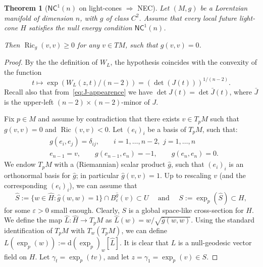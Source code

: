 \documentclass[12pt,a4paper]{amsart}
\theoremstyle{plain}
\newtheorem{theorem}[lemma]{Theorem}
\theoremstyle{definition}
\numberwithin{equation}{section}
\let\temp\phi
\let\phi\varphi
\let\temp\epsilon
\let\epsilon\varepsilon
\let\varepsilon\temp
\DeclareMathOperator{\Ric}{Ric}
\newcommand{\de}{{\mathrm{d}}}
\newcommand{\NC}{\mathsf{NC}}
\begin{document}
\begin{theorem}[$\NC^1(n)$ on light-cones $\Rightarrow$ NEC]\label{thm:NC1toNEC}
  Let $(M,g)$ be a Lorentzian manifold of dimension $n$, with $g$ of
  class $C^2$.
  Assume that every local future light-cone $H$ satisfies the
   null energy condition $\NC^1(n)$.

  Then $\Ric_g(v,v)\geq 0$ for any $v\in TM$, such that $g(v,v)=0$.
\end{theorem}


\begin{proof}
By the the definition of $W_{L}$, the hypothesis coincides with the convexity of the function
\begin{equation*}
  t\mapsto \exp(W_{L}(z,t)/(n-2))=(\det(J(t)))^{1/(n-2)}
  .
\end{equation*}
Recall also that from~\eqref{eq:J-appearence} we have
  $\det J(t)=\det \bar J(t)$, where $\bar J$ is the upper-left
  $(n-2)\times(n-2)$-minor of $J$.

  Fix $p\in M$ and assume by contradiction that there exists  $v\in T_pM$ such that  $g(v,v)=0$ and $\Ric(v,v)<0$.
  Let $(e_i)_i$ be a basis of $T_pM$, such that:
  \begin{align}
    &
      g(e_i,e_j)=\delta_{ij}
      ,
      \qquad
      i=1,\dots,n-2, \,\, j=1,\dots,n
    \\
    &
      e_{n-1}=v
      ,
      \qquad
      g(e_{n-1},e_{n})=-1
      ,
      \qquad
      g(e_{n},e_{n})=0
      .
  \end{align}
  We endow $T_pM$ with a (Riemannian) scalar product $\hat g$, such that $(e_i)_i$ is
  an orthonormal basis for $\hat g$; in particular $\hat g(v,v)=1$.
  Up to rescaling $v$ (and the corresponding $(e_i)_i$), we can assume that
  \begin{equation*}
    \hat S
    :=
    \{
    w\in
    \hat H
    :
    \hat g(w,w)=1
    \}
    \cap
    B_{\epsilon}^{\hat{g}}(v)
    \subset U
  \quad
  \text{ and }
  \quad
  S:=\exp_p(\hat S)
  \subset H
    ,
  \end{equation*}
  for some $\epsilon>0$ small enough.
  Clearly, $S$ is a global space-like cross-section for $H$.
  We define the map $\hat L: \hat H\to T_pM$ as $\hat
  L(w)= w/\sqrt{\hat g(w,w)}$.
  Using the standard identification of $T_pM$ with $T_w(T_pM)$, we can
  define $L(\exp_p(w)):=\de (\exp_p)_w[\hat L]$.
  It is clear that $L$ is a null-geodesic vector field on $H$.
  Let $\gamma_t=\exp_p(t v)$, and let
  $z=\gamma_1=\exp_p( v)\in S$.


\end{proof}
\end{document}
